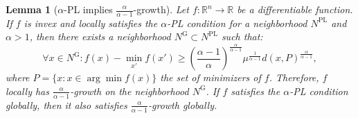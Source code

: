 \documentclass{article}
\newtheorem{lemma}{Lemma}
\newcommand{\R}{\mathbb{R}}
\begin{document}
\begin{lemma}[$\alpha$-PL implies $\frac{\alpha}{\alpha-1}$-growth] 
    \label{lem:PLgrowth}  
    Let $f:\R^n \to \R$ be a differentiable function. If $f$ is invex and locally satisfies the $\alpha$-PL condition for a neighborhood $N^{\text{PL}}$ and $\alpha>1$, then there exists a neighborhood $N^{\text{G}}\subset N^{\text{PL}}$ such that:
    \begin{equation}
    \label{eq:growth}
    \forall x \in N^{\text{G}}: f(x)-\min_{x'}f(x')\geq \left(\frac{\alpha-1}{\alpha}\right) ^{\frac{\alpha}{\alpha-1}} \mu^{\frac{1}{\alpha-1}} d(x,P)^\frac{\alpha}{\alpha-1},
    \end{equation}
    where $P=\{x:x\in \arg\min f(x)\}$ the set of minimizers of $f$.
    Therefore, $f$ locally has $\frac{\alpha}{\alpha-1}$-growth on the neighborhood $N^{\text{G}}$. If $f$ satisfies the $\alpha$-PL condition globally, then it also satisfies $\frac{\alpha}{\alpha-1}$-growth globally.
\end{lemma}
  
\end{document}
